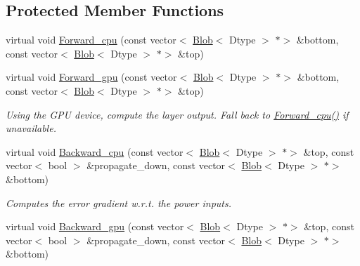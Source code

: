 \subsection*{Protected Member Functions}
\begin{DoxyCompactItemize}
\item 
virtual void \mbox{\hyperlink{classcaffe_1_1_power_layer_a3f0196eab7b1f374a4705426d42b0711}{Forward\+\_\+cpu}} (const vector$<$ \mbox{\hyperlink{classcaffe_1_1_blob}{Blob}}$<$ Dtype $>$ $\ast$$>$ \&bottom, const vector$<$ \mbox{\hyperlink{classcaffe_1_1_blob}{Blob}}$<$ Dtype $>$ $\ast$$>$ \&top)
\item 
\mbox{\label{classcaffe_1_1_power_layer_a0b68dfd6ade0964fcfa58c0997c59db0}} 
virtual void \mbox{\hyperlink{classcaffe_1_1_power_layer_a0b68dfd6ade0964fcfa58c0997c59db0}{Forward\+\_\+gpu}} (const vector$<$ \mbox{\hyperlink{classcaffe_1_1_blob}{Blob}}$<$ Dtype $>$ $\ast$$>$ \&bottom, const vector$<$ \mbox{\hyperlink{classcaffe_1_1_blob}{Blob}}$<$ Dtype $>$ $\ast$$>$ \&top)
\begin{DoxyCompactList}\small\item\em Using the G\+PU device, compute the layer output. Fall back to \mbox{\hyperlink{classcaffe_1_1_power_layer_a3f0196eab7b1f374a4705426d42b0711}{Forward\+\_\+cpu()}} if unavailable. \end{DoxyCompactList}\item 
virtual void \mbox{\hyperlink{classcaffe_1_1_power_layer_a98e5481671ca13339f888cad61b3d515}{Backward\+\_\+cpu}} (const vector$<$ \mbox{\hyperlink{classcaffe_1_1_blob}{Blob}}$<$ Dtype $>$ $\ast$$>$ \&top, const vector$<$ bool $>$ \&propagate\+\_\+down, const vector$<$ \mbox{\hyperlink{classcaffe_1_1_blob}{Blob}}$<$ Dtype $>$ $\ast$$>$ \&bottom)
\begin{DoxyCompactList}\small\item\em Computes the error gradient w.\+r.\+t. the power inputs. \end{DoxyCompactList}\item 
\mbox{\label{classcaffe_1_1_power_layer_a72c15e7b1a1907746bf74db86435d181}} 
virtual void \mbox{\hyperlink{classcaffe_1_1_power_layer_a72c15e7b1a1907746bf74db86435d181}{Backward\+\_\+gpu}} (const vector$<$ \mbox{\hyperlink{classcaffe_1_1_blob}{Blob}}$<$ Dtype $>$ $\ast$$>$ \&top, const vector$<$ bool $>$ \&propagate\+\_\+down, const vector$<$ \mbox{\hyperlink{classcaffe_1_1_blob}{Blob}}$<$ Dtype $>$ $\ast$$>$ \&bottom)

\end{DoxyCompactItemize}
